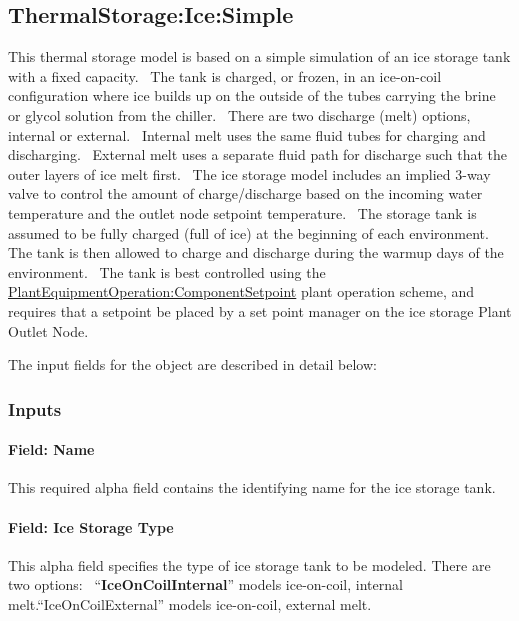 \subsection{ThermalStorage:Ice:Simple}\label{thermalstorageicesimple}

This thermal storage model is based on a simple simulation of an ice storage tank with a fixed capacity.~ The tank is charged, or frozen, in an ice-on-coil configuration where ice builds up on the outside of the tubes carrying the brine or glycol solution from the chiller.~ There are two discharge (melt) options, internal or external.~ Internal melt uses the same fluid tubes for charging and discharging.~ External melt uses a separate fluid path for discharge such that the outer layers of ice melt first.~ The ice storage model includes an implied 3-way valve to control the amount of charge/discharge based on the incoming water temperature and the outlet node setpoint temperature.~ The storage tank is assumed to be fully charged (full of ice) at the beginning of each environment.~ The tank is then allowed to charge and discharge during the warmup days of the environment.~ The tank is best controlled using the \hyperref[plantequipmentoperationcomponentsetpoint]{PlantEquipmentOperation:ComponentSetpoint} plant operation scheme, and requires that a setpoint be placed by a set point manager on the ice storage Plant Outlet Node.

The input fields for the object are described in detail below:

\subsubsection{Inputs}\label{inputs-20-004}

\paragraph{Field: Name}\label{field-name-20-001}

This required alpha field contains the identifying name for the ice storage tank.

\paragraph{Field: Ice Storage Type}\label{field-ice-storage-type}

This alpha field specifies the type of ice storage tank to be modeled. There are two options:~ ``\textbf{IceOnCoilInternal}'' models ice-on-coil, internal melt.``IceOnCoilExternal'' models ice-on-coil, external melt.

